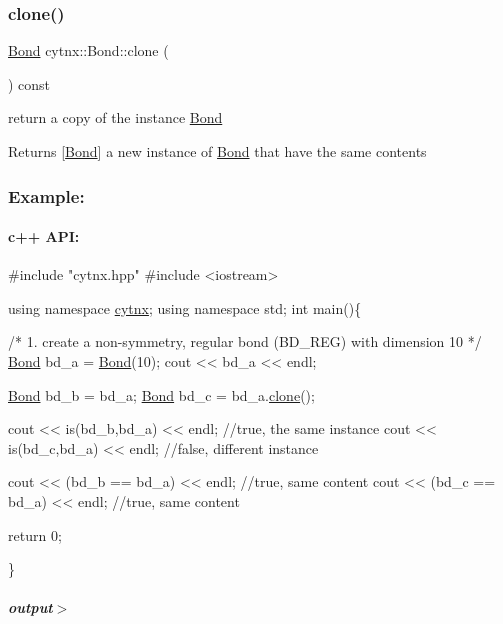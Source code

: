\subsubsection{\texorpdfstring{clone()}{clone()}}
{\footnotesize\ttfamily \hyperlink{classcytnx_1_1Bond}{Bond} cytnx\+::\+Bond\+::clone (\begin{DoxyParamCaption}{ }\end{DoxyParamCaption}) const\hspace{0.3cm}{\ttfamily [inline]}}



return a copy of the instance \hyperlink{classcytnx_1_1Bond}{Bond} 

\begin{DoxyReturn}{Returns}
\mbox{[}\hyperlink{classcytnx_1_1Bond}{Bond}\mbox{]} a new instance of \hyperlink{classcytnx_1_1Bond}{Bond} that have the same contents
\end{DoxyReturn}
\subsubsection*{Example\+:}

\paragraph*{c++ A\+PI\+:}


\begin{DoxyCodeInclude}
\textcolor{preprocessor}{#include "cytnx.hpp"}
\textcolor{preprocessor}{#include <iostream>}


\textcolor{keyword}{using namespace }\hyperlink{namespacecytnx}{cytnx};
\textcolor{keyword}{using namespace }std;
\textcolor{keywordtype}{int} main()\{ 

    \textcolor{comment}{/* 1.}
\textcolor{comment}{        create a non-symmetry, regular bond (BD\_REG) }
\textcolor{comment}{        with dimension 10}
\textcolor{comment}{    */}
    \hyperlink{classcytnx_1_1Bond}{Bond} bd\_a = \hyperlink{classcytnx_1_1Bond}{Bond}(10);
    cout << bd\_a << endl;

    \hyperlink{classcytnx_1_1Bond}{Bond} bd\_b = bd\_a;
    \hyperlink{classcytnx_1_1Bond}{Bond} bd\_c = bd\_a.\hyperlink{classcytnx_1_1Bond_a8c4d6443ffe7c3f3ecd8c474fd9a18eb}{clone}();

    cout << is(bd\_b,bd\_a) << endl; \textcolor{comment}{//true, the same instance}
    cout << is(bd\_c,bd\_a) << endl; \textcolor{comment}{//false, different instance}

    cout << (bd\_b == bd\_a) << endl; \textcolor{comment}{//true, same content}
    cout << (bd\_c == bd\_a) << endl; \textcolor{comment}{//true, same content}

    \textcolor{keywordflow}{return} 0;

\}

\end{DoxyCodeInclude}
 \subparagraph*{output$>$}


